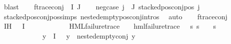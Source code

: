 \begin{isabellebody}
\ blast\isanewline
{}\isamarkupfalse%
\isanewline
\ \ \isamarkupfalse%
\ {\isacharparenleft}{\kern0pt}f{\isacharunderscore}{\kern0pt}trace{\isacharunderscore}{\kern0pt}conj\ {\isasymPhi}\ I\ J{\isacharparenright}{\kern0pt}\isanewline
\ \ \isamarkupfalse%
\ neg{\isacharunderscore}{\kern0pt}case{\isacharcolon}{\kern0pt}\ {\isachardoublequoteopen}{\isasymforall}j{\isasymin}{\isasymPhi}\ {\isacharbackquote}{\kern0pt}\ J{\isachardot}{\kern0pt}\ stacked{\isacharunderscore}{\kern0pt}pos{\isacharunderscore}{\kern0pt}conj{\isacharunderscore}{\kern0pt}pos\ j{\isachardoublequoteclose}\ \isanewline
\ \ \ \ \isamarkupfalse%
\ stacked{\isacharunderscore}{\kern0pt}pos{\isacharunderscore}{\kern0pt}conj{\isacharunderscore}{\kern0pt}pos{\isachardot}{\kern0pt}simps\ nested{\isacharunderscore}{\kern0pt}empty{\isacharunderscore}{\kern0pt}pos{\isacharunderscore}{\kern0pt}conj{\isachardot}{\kern0pt}intros{\isacharparenleft}{\kern0pt}{}{\isacharparenright}{\kern0pt}\ \isamarkupfalse%
\ auto\isanewline
\ \ \isamarkupfalse%
\ f{\isacharunderscore}{\kern0pt}trace{\isacharunderscore}{\kern0pt}conj\ \isamarkupfalse%
\ IH{\isacharcolon}{\kern0pt}\ {\isachardoublequoteopen}{\isacharparenleft}{\kern0pt}{\isacharparenleft}{\kern0pt}{\isasymexists}{\isasympsi}{\isasymin}{\isasymPhi}\ {\isacharbackquote}{\kern0pt}\ I{\isachardot}{\kern0pt}\isanewline
\ \ \ \ \ \ \ \ \ \ \ \ {\isacharparenleft}{\kern0pt}HML{\isacharunderscore}{\kern0pt}failure{\isacharunderscore}{\kern0pt}trace\ {\isasympsi}\ {\isasymand}\ {\isacharparenleft}{\kern0pt}{\isasymexists}{\isasympsi}{\isacharprime}{\kern0pt}{\isachardot}{\kern0pt}\ hml{\isacharunderscore}{\kern0pt}failure{\isacharunderscore}{\kern0pt}trace\ {\isasympsi}{\isacharprime}{\kern0pt}\ {\isasymand}\ {\isacharparenleft}{\kern0pt}{\isasymforall}s{\isachardot}{\kern0pt}\ {\isacharparenleft}{\kern0pt}s\ {\isasymTurnstile}\ {\isasympsi}{\isacharparenright}{\kern0pt}\ {\isacharequal}{\kern0pt}\ {\isacharparenleft}{\kern0pt}s\ {\isasymTurnstile}\ {\isasympsi}{\isacharprime}{\kern0pt}{\isacharparenright}{\kern0pt}{\isacharparenright}{\kern0pt}{\isacharparenright}{\kern0pt}{\isacharparenright}{\kern0pt}\ {\isasymand}\isanewline
\ \ \ \ \ \ \ \ \ \ \ \ {\isacharparenleft}{\kern0pt}{\isasymforall}y{\isasymin}{\isasymPhi}\ {\isacharbackquote}{\kern0pt}\ I{\isachardot}{\kern0pt}\ {\isasympsi}\ {\isasymnoteq}\ y\ {\isasymlongrightarrow}\ nested{\isacharunderscore}{\kern0pt}empty{\isacharunderscore}{\kern0pt}conj\ y{\isacharparenright}{\kern0pt}{\isacharparenright}{\kern0pt}\ {\isasymor}\isanewline

\end{isabellebody}

